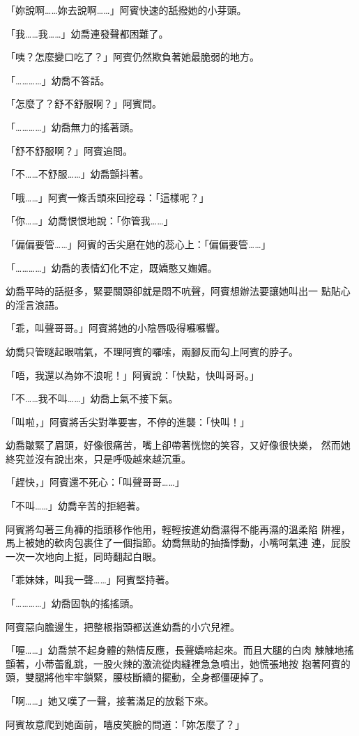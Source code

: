 「妳說啊……妳去說啊……」阿賓快速的舐撥她的小芽頭。

「我……我……」幼喬連發聲都困難了。

「咦？怎麼變口吃了？」阿賓仍然欺負著她最脆弱的地方。

「…………」幼喬不答話。

「怎麼了？舒不舒服啊？」阿賓問。

「…………」幼喬無力的搖著頭。

「舒不舒服啊？」阿賓追問。

「不……不舒服……」幼喬顫抖著。

「哦……」阿賓一條舌頭來回挖尋：「這樣呢？」

「你……」幼喬恨恨地說：「你管我……」

「偏偏要管……」阿賓的舌尖磨在她的蕊心上：「偏偏要管……」

「…………」幼喬的表情幻化不定，既嬌憨又嫵媚。

幼喬平時的話挺多，緊要關頭卻就是悶不吭聲，阿賓想辦法要讓她叫出一
點貼心的淫言浪語。

「乖，叫聲哥哥。」阿賓將她的小陰唇吸得囌囌響。

幼喬只管瞇起眼喘氣，不理阿賓的囉嗦，兩腳反而勾上阿賓的脖子。

「唔，我還以為妳不浪呢！」阿賓說：「快點，快叫哥哥。」

「不……我不叫……」幼喬上氣不接下氣。

「叫啦，」阿賓將舌尖對準要害，不停的進襲：「快叫！」

幼喬皺緊了眉頭，好像很痛苦，嘴上卻帶著恍惚的笑容，又好像很快樂，
然而她終究並沒有說出來，只是呼吸越來越沉重。

「趕快，」阿賓還不死心：「叫聲哥哥……」

「不叫……」幼喬辛苦的拒絕著。

阿賓將勾著三角褲的指頭移作他用，輕輕按進幼喬濕得不能再濕的溫柔陷
阱裡，馬上被她的軟肉包裹住了一個指節。幼喬無助的抽搐悸動，小嘴呵氣連
連，屁股一次一次地向上挺，同時翻起白眼。

「乖妹妹，叫我一聲……」阿賓堅持著。

「…………」幼喬固執的搖搖頭。

阿賓惡向膽邊生，把整根指頭都送進幼喬的小穴兒裡。

「喔……」幼喬禁不起身體的熱情反應，長聲嬌啼起來。而且大腿的白肉
觫觫地搖顫著，小蒂蕾亂跳，一股火辣的激流從肉縫裡急急噴出，她慌張地按
抱著阿賓的頭，雙腿將他牢牢鎖緊，腰枝斷續的擺動，全身都僵硬掉了。

「啊……」她又嘆了一聲，接著滿足的放鬆下來。

阿賓故意爬到她面前，嘻皮笑臉的問道：「妳怎麼了？」

